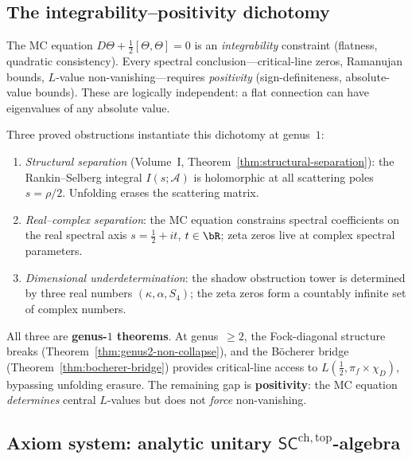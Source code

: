 \documentclass[11pt]{article}
\newcommand{\cA}{\mathcal{A}}
\newcommand{\SCchtop}{\mathsf{SC}^{\mathrm{ch,top}}}
\begin{document}
\subsection{The integrability--positivity dichotomy}
\label{sec:integrability-positivity}

The MC equation $D\Theta + \tfrac{1}{2}[\Theta,\Theta] = 0$ is
an \emph{integrability} constraint (flatness, quadratic
consistency).  Every spectral conclusion---critical-line zeros,
Ramanujan bounds, $L$-value non-vanishing---requires
\emph{positivity} (sign-definiteness, absolute-value bounds).
These are logically independent: a flat connection can have
eigenvalues of any absolute value.

Three proved obstructions instantiate this dichotomy at genus~$1$:
\begin{enumerate}[label=\textup{(\roman*)}]
\item \emph{Structural separation}
  \textup{(}Volume~I,
  Theorem~\ref*{thm:structural-separation}\textup{)}: the
  Rankin--Selberg integral $I(s;\cA)$ is holomorphic at all
  scattering poles $s = \rho/2$.  Unfolding erases the
  scattering matrix.
\item \emph{Real--complex separation}: the MC equation constrains
  spectral coefficients on the real spectral axis
  $s = \tfrac{1}{2} + it$, $t \in \bR$; zeta zeros live at
  complex spectral parameters.
\item \emph{Dimensional underdetermination}: the shadow
  obstruction tower is determined by three real numbers
  $(\kappa, \alpha, S_4)$; the zeta zeros form a countably
  infinite set of complex numbers.
\end{enumerate}
All three are \textbf{genus-$1$ theorems}.  At genus~$\geq 2$,
the Fock-diagonal structure breaks
(Theorem~\ref*{thm:genus2-non-collapse}), and the
B\"ocherer bridge
(Theorem~\ref*{thm:bocherer-bridge})
provides critical-line access to $L(\tfrac{1}{2},
\pi_f \times \chi_D)$, bypassing unfolding erasure.
The remaining gap is \textbf{positivity}: the MC equation
\emph{determines} central $L$-values but does not
\emph{force} non-vanishing.

\subsection{Axiom system: analytic unitary
  $\SCchtop$-algebra}
\label{sec:analytic-axioms}
\end{document}
